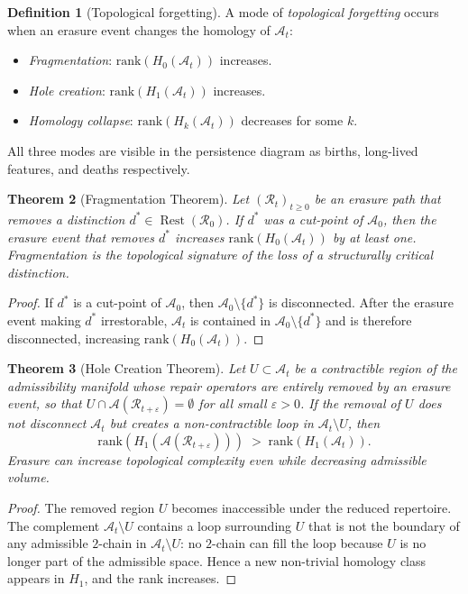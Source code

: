 \documentclass[12pt, oneside]{article}
\theoremstyle{plain}
\newtheorem{theorem}{Theorem}[section]
\theoremstyle{definition}
\newtheorem{definition}[theorem]{Definition}
\theoremstyle{remark}
\DeclareMathOperator{\Rest}{Rest}
\newcommand{\AO}{\mathcal{A}}
\newcommand{\At}{\mathcal{A}_t}
\newcommand{\Azero}{\mathcal{A}_0}
\newcommand{\Rt}{\mathcal{R}_t}
\newcommand{\Rzero}{\mathcal{R}_0}
\newcommand{\Restzero}{\Rest(\Rzero)}
\begin{document}
\begin{definition}[Topological forgetting]
  A mode of \emph{topological forgetting} occurs when an erasure
  event changes the homology of $\At$:
  \begin{itemize}
    \item \emph{Fragmentation}: $\mathrm{rank}(H_0(\At))$ increases.
    \item \emph{Hole creation}: $\mathrm{rank}(H_1(\At))$ increases.
    \item \emph{Homology collapse}: $\mathrm{rank}(H_k(\At))$
      decreases for some $k$.
  \end{itemize}
  All three modes are visible in the persistence diagram as
  births, long-lived features, and deaths respectively.
\end{definition}

\begin{theorem}[Fragmentation Theorem]
  Let $(\Rt)_{t \geq 0}$ be an erasure path that removes a
  distinction $d^* \in \Restzero$.
  If $d^*$ was a cut-point of $\Azero$, then the erasure event
  that removes $d^*$ increases $\mathrm{rank}(H_0(\At))$ by at
  least one.
  Fragmentation is the topological signature of the loss of a
  structurally critical distinction.
  \label{thm:homology-change}
\end{theorem}

\begin{proof}
  If $d^*$ is a cut-point of $\Azero$, then $\Azero \setminus
  \{d^*\}$ is disconnected.
  After the erasure event making $d^*$ irrestorable, $\At$ is
  contained in $\Azero \setminus \{d^*\}$ and is therefore
  disconnected, increasing $\mathrm{rank}(H_0(\At))$.
\end{proof}

\begin{theorem}[Hole Creation Theorem]
  Let $U \subset \At$ be a contractible region of the admissibility
  manifold whose repair operators are entirely removed by an erasure
  event, so that $U \cap \AO(\mathcal{R}_{t+\varepsilon}) =
  \emptyset$ for all small $\varepsilon > 0$.
  If the removal of $U$ does not disconnect $\At$ but creates a
  non-contractible loop in $\At \setminus U$, then
  \[
    \mathrm{rank}(H_1(\AO(\mathcal{R}_{t+\varepsilon})))
    \;>\;
    \mathrm{rank}(H_1(\At)).
  \]
  Erasure can increase topological complexity even while decreasing
  admissible volume.
  \label{thm:hole-creation}
\end{theorem}

\begin{proof}
  The removed region $U$ becomes inaccessible under the reduced
  repertoire.
  The complement $\At \setminus U$ contains a loop surrounding $U$
  that is not the boundary of any admissible $2$-chain in
  $\At \setminus U$: no $2$-chain can fill the loop because $U$ is
  no longer part of the admissible space.
  Hence a new non-trivial homology class appears in $H_1$, and the
  rank increases.
\end{proof}
\end{document}
